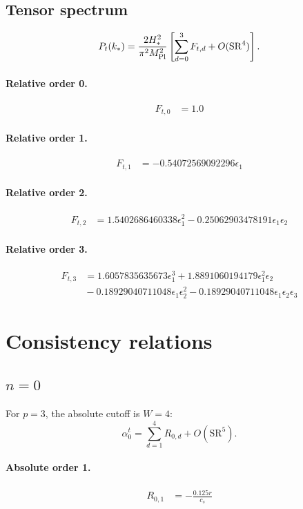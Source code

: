 \documentclass[10pt]{article}
\begin{document}
\subsection{Tensor spectrum}
\[P_t(k_*)=\frac{2H_*^2}{\pi^2M_{\rm Pl}^2}\left[\sum_{d=0}^{3}F_{t,d}+O(\mathrm{SR}^{4})\right].\]
\paragraph{Relative order 0.}
\begin{align*}
F_{t,0} &= 1.0
\end{align*}

\paragraph{Relative order 1.}
\begin{align*}
F_{t,1} &=  - 0.54072569092296 \epsilon_{1}
\end{align*}

\paragraph{Relative order 2.}
\begin{align*}
F_{t,2} &= 1.5402686460338 \epsilon_{1}^{2} - 0.25062903478191 \epsilon_{1} \epsilon_{2}
\end{align*}

\paragraph{Relative order 3.}
\begin{align*}
F_{t,3} &= 1.6057835635673 \epsilon_{1}^{3} + 1.8891060194179 \epsilon_{1}^{2} \epsilon_{2} \\
&{}  - 0.18929040711048 \epsilon_{1} \epsilon_{2}^{2} - 0.18929040711048 \epsilon_{1} \epsilon_{2} \epsilon_{3}
\end{align*}

\section{Consistency relations}
\subsection{$n=0$}
For $p=3$, the absolute cutoff is $W=4$:
\[\alpha_{0}^t=\sum_{d=1}^{4}R_{0,d}+O(\mathrm{SR}^{5}).\]
\paragraph{Absolute order 1.}
\begin{align*}
R_{0,1} &=  - \frac{0.125 r}{c_{s}}
\end{align*}
\end{document}
